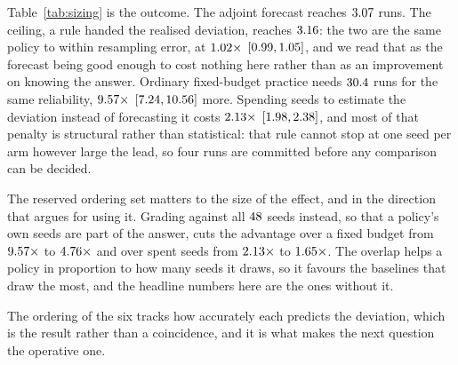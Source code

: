 Table~\ref{tab:sizing} is the outcome. The adjoint forecast reaches $3.07$ runs.
The ceiling, a rule handed the realised deviation, reaches $3.16$: the two are the
same policy to within resampling error, at $1.02\times$
$[0.99, 1.05]$, and we read that as the forecast being good enough to cost
nothing here rather than as an improvement on knowing the answer. Ordinary fixed-budget practice
needs $30.4$ runs for the same reliability, $9.57\times$
$[7.24, 10.56]$ more. Spending seeds to estimate the deviation instead of
forecasting it costs $2.13\times$
$[1.98, 2.38]$, and most of that penalty is structural rather than
statistical: that rule cannot stop at one seed per arm however large the lead, so four runs are
committed before any comparison can be decided.

The reserved ordering set matters to the size of the effect, and in the direction that argues for
using it. Grading against all $48$ seeds instead, so that a policy's own seeds are part
of the answer, cuts the advantage over a fixed budget from $9.57\times$ to
$4.76\times$ and over spent seeds from $2.13\times$ to
$1.65\times$. The overlap helps a policy in proportion to how many seeds it
draws, so it favours the baselines that draw the most, and the headline numbers here are the ones
without it.

\begin{table}[t]
  \centering
  \small
  
  \caption{Runs needed to hold the mistake rate at $\numSizeTarget\%$ over $\numSizePairs$
  unambiguous comparisons, both arms counted, with $95\%$ intervals from resampling the
  comparisons. The forecast is not better than knowing the deviation; it is not measurably worse,
  which is the point. Ordering follows forecast accuracy: the adjoint forecast is
  $\numSizeForecastError\times$ off at the median here, the frozen predictor
  is coarser, and a constant deviation discards the variation entirely.}
  \label{tab:sizing}
\end{table}

The ordering of the six tracks how accurately each predicts the deviation, which is the result
rather than a coincidence, and it is what makes the next question the operative one.

